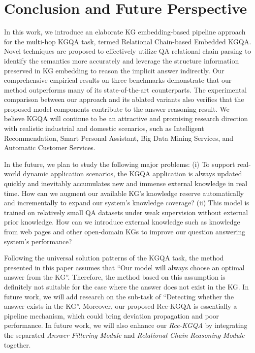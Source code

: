 \documentclass[pdflatex,sn-mathphys]{sn-jnl}%
\theoremstyle{thmstyleone}%
\theoremstyle{thmstyletwo}%
\theoremstyle{thmstylethree}%
\begin{document}
\section{Conclusion and Future Perspective}
\label{conclusion}
In this work, we introduce an elaborate KG embedding-based pipeline approach for the multi-hop KGQA task, termed Relational Chain-based Embedded KGQA. Novel techniques are proposed to effectively utilize QA relational chain parsing to identify the semantics more accurately and leverage the structure information preserved in KG embedding to reason the implicit answer indirectly.
Our comprehensive empirical results on three benchmarks demonstrate that our method outperforms many of its state-of-the-art counterparts. The experimental comparison between our approach and its ablated variants also verifies that the proposed model components contribute to the answer reasoning result.
We believe KGQA will continue to be an attractive and promising research direction with realistic industrial and domestic scenarios, such as Intelligent Recommendation, Smart Personal Assistant, Big Data Mining Services, and Automatic Customer Services.

In the future, we plan to study the following major problems: (i) To support real-world dynamic application scenarios, the KGQA application is always updated quickly and inevitably accumulates new and immense external knowledge in real time. How can we augment our available KG's knowledge reserve automatically and incrementally to expand our system's knowledge coverage? (ii) This model is trained on relatively small QA datasets under weak supervision without external prior knowledge. How can we introduce external knowledge such as knowledge from web pages and other open-domain KGs to improve our question answering system's performance?

\textcolor[rgb]{1,0,0}{
Following the universal solution patterns of the KGQA task, the method presented in this paper assumes that ``Our model will always choose an optimal answer from the KG''. Therefore, the method based on this assumption is definitely not suitable for the case where the answer does not exist in the KG. In future work, we will add research on the sub-task of ``Detecting whether the answer exists in the KG''. Moreover, our proposed Rce-KGQA is essentially a pipeline mechanism, which could bring deviation propagation and poor performance. In future work, we will also enhance our \textit{Rce-KGQA} by integrating the separated \textit{Answer Filtering Module} and \textit{Relational Chain Reasoning Module} together.}
\end{document}
